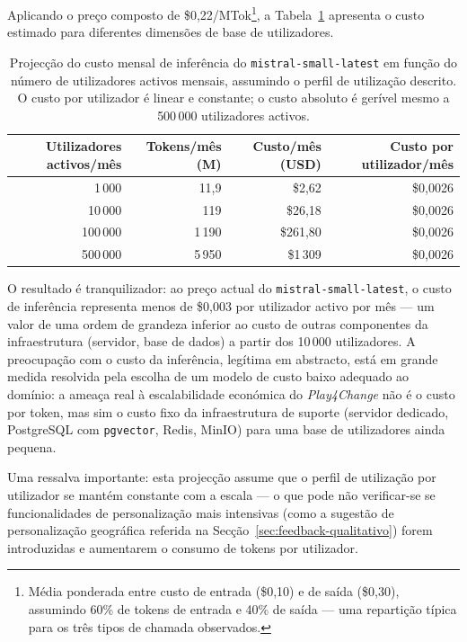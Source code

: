 Aplicando o preço composto de \$0,22/MTok\footnote{Média ponderada entre custo de entrada (\$0,10) e de saída (\$0,30), assumindo 60\% de tokens de entrada e 40\% de saída --- uma repartição típica para os três tipos de chamada observados.}, a Tabela~\ref{tab:custo-escala} apresenta o custo estimado para diferentes dimensões de base de utilizadores.

\begin{table}[htbp]
    \centering
    \small
    \begin{tabular}{r r r r}
        \toprule
        \textbf{Utilizadores activos/mês} &
        \textbf{Tokens/mês (M)} &
        \textbf{Custo/mês (USD)} &
        \textbf{Custo por utilizador/mês} \\
        \midrule
        1\,000   & 11,9  & \$2,62    & \$0,0026 \\
        10\,000  & 119   & \$26,18   & \$0,0026 \\
        100\,000 & 1\,190 & \$261,80 & \$0,0026 \\
        500\,000 & 5\,950 & \$1\,309  & \$0,0026 \\
        \bottomrule
    \end{tabular}
    \caption[Projecção de custo de inferência a escala]{Projecção do custo mensal de inferência do \texttt{mistral-small-latest} em função do número de utilizadores activos mensais, assumindo o perfil de utilização descrito. O custo por utilizador é linear e constante; o custo absoluto é gerível mesmo a 500\,000 utilizadores activos.}
    \label{tab:custo-escala}
\end{table}

O resultado é tranquilizador: ao preço actual do \texttt{mistral-small-latest}, o custo de inferência representa menos de \$0,003 por utilizador activo por mês --- um valor de uma ordem de grandeza inferior ao custo de outras componentes da infraestrutura (servidor, base de dados) a partir dos 10\,000 utilizadores. A preocupação com o custo da inferência, legítima em abstracto, está em grande medida resolvida pela escolha de um modelo de custo baixo adequado ao domínio: a ameaça real à escalabilidade económica do \emph{Play4Change} não é o custo por token, mas sim o custo fixo da infraestrutura de suporte (servidor dedicado, PostgreSQL com \texttt{pgvector}, Redis, MinIO) para uma base de utilizadores ainda pequena.

Uma ressalva importante: esta projecção assume que o perfil de utilização por utilizador se mantém constante com a escala --- o que pode não verificar-se se funcionalidades de personalização mais intensivas (como a sugestão de personalização geográfica referida na Secção~\ref{sec:feedback-qualitativo}) forem introduzidas e aumentarem o consumo de tokens por utilizador.
